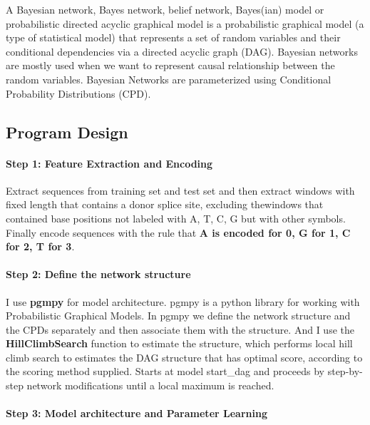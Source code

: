\documentclass{gapd}
\begin{document}
A Bayesian network, Bayes network, belief network, Bayes(ian) model or
probabilistic directed acyclic graphical model is a probabilistic
graphical model (a type of statistical model) that represents a set of
random variables and their conditional dependencies via a directed
acyclic graph (DAG). Bayesian networks are mostly used when we want to
represent causal relationship between the random variables. Bayesian
Networks are parameterized using Conditional Probability Distributions
(CPD).


\subsection{Program Design}\label{program-design}

\paragraph{Step 1: Feature Extraction and
Encoding}\label{feature-extraction-and-encoding}

Extract sequences from training set and test set and then extract
windows with fixed length that contains a donor splice site, excluding
thewindows that contained base positions not labeled with A, T, C, G but
with other symbols. Finally encode sequences with the rule that
\textbf{A is encoded for 0, G for 1, C for 2, T for 3}.

\paragraph{Step 2: Define the network
structure}\label{define-the-network-structure}

I use \textbf{pgmpy} for model architecture. pgmpy is a python library
for working with Probabilistic Graphical Models. In pgmpy we define the
network structure and the CPDs separately and then associate them with
the structure. And I use the \textbf{HillClimbSearch} function to
estimate the structure, which performs local hill climb search to
estimates the DAG structure that has optimal score, according to the
scoring method supplied. Starts at model start\_dag and proceeds by
step-by-step network modifications until a local maximum is reached.

\paragraph{Step 3: Model architecture and Parameter
Learning}\label{model-architecture-and-parameter-learning}
\end{document}
